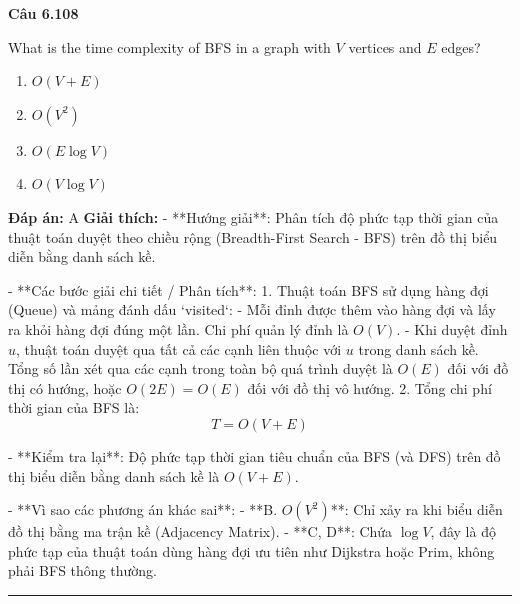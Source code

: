 \documentclass[11pt,a4paper]{article}
\newenvironment{question}[1]{%
  \par\vspace{1em}\noindent\textbf{\large Câu #1}\par\vspace{0.4em}
}{%
  \par\vspace{1em}\hrule\vspace{0.6em}
}
\newenvironment{choices}{%
  \begin{enumerate}[label=\textbf{\Alph*.},leftmargin=2.2em,itemsep=2pt,topsep=3pt]
}{%
  \end{enumerate}
}
\newcommand{\choice}{\item}
\begin{document}
\begin{question}{6.108}
What is the time complexity of BFS in a graph with \(V\) vertices and \(E\) edges?
\begin{choices}
\choice \(O(V + E)\)
\choice \(O(V^2)\)
\choice \(O(E \log V)\)
\choice \(O(V \log V)\)
\end{choices}
\textbf{Đáp án:} A
\textbf{Giải thích:} - **Hướng giải**:
  Phân tích độ phức tạp thời gian của thuật toán duyệt theo chiều rộng (Breadth-First Search - BFS) trên đồ thị biểu diễn bằng danh sách kề.

- **Các bước giải chi tiết / Phân tích**:
  1. Thuật toán BFS sử dụng hàng đợi (Queue) và mảng đánh dấu `visited`:
     - Mỗi đỉnh được thêm vào hàng đợi và lấy ra khỏi hàng đợi đúng một lần. Chi phí quản lý đỉnh là \(O(V)\).
     - Khi duyệt đỉnh \(u\), thuật toán duyệt qua tất cả các cạnh liên thuộc với \(u\) trong danh sách kề. Tổng số lần xét qua các cạnh trong toàn bộ quá trình duyệt là \(O(E)\) đối với đồ thị có hướng, hoặc \(O(2E) = O(E)\) đối với đồ thị vô hướng.
  2. Tổng chi phí thời gian của BFS là:
     \[
     T = O(V + E)
     \]

- **Kiểm tra lại**:
  Độ phức tạp thời gian tiêu chuẩn của BFS (và DFS) trên đồ thị biểu diễn bằng danh sách kề là \(O(V + E)\).

- **Vì sao các phương án khác sai**:
  - **B. \(O(V^2)\)**: Chỉ xảy ra khi biểu diễn đồ thị bằng ma trận kề (Adjacency Matrix).
  - **C, D**: Chứa \(\log V\), đây là độ phức tạp của thuật toán dùng hàng đợi ưu tiên như Dijkstra hoặc Prim, không phải BFS thông thường.
\end{question}
\end{document}
